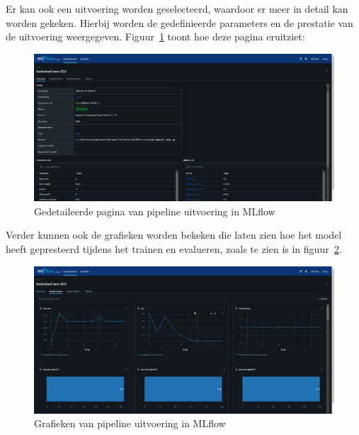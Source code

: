 Er kan ook een uitvoering worden geselecteerd, waardoor er meer in detail kan worden gekeken. Hierbij worden de gedefinieerde parameters en de prestatie van de uitvoering weergegeven. Figuur~\ref{fig:MLflow_informatie} toont hoe deze pagina eruitziet:
\begin{figure}
    \centering
    \includegraphics[width=0.9\linewidth]{graphics/MLflow_Information.PNG}
    \caption{Gedetaileerde pagina van pipeline uitvoering in MLflow}
    \label{fig:MLflow_informatie}
\end{figure}
Verder kunnen ook de grafieken worden bekeken die laten zien hoe het model heeft gepresteerd tijdens het trainen en evalueren, zoals te zien is in figuur~\ref{fig:MLflow_graph}.
\begin{figure}
    \centering
    \includegraphics[width=0.9\linewidth]{graphics/mlflow_Graph.PNG}
    \caption{Grafieken van pipeline uitvoering in MLflow}
    \label{fig:MLflow_graph}
\end{figure}